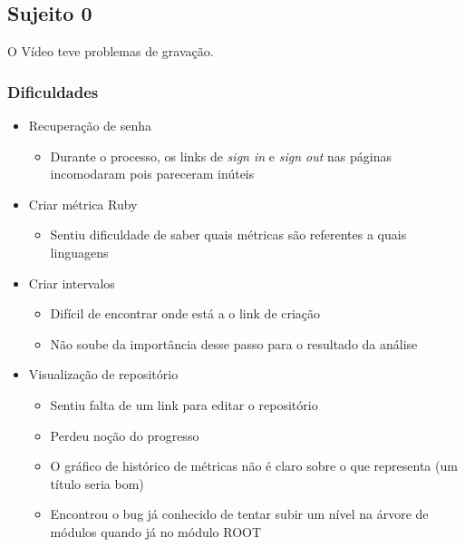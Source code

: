 \subsection{Sujeito 0}
  O Vídeo teve problemas de gravação.

  \subsubsection{Dificuldades}
  \begin{itemize}
    \item Recuperação de senha
      \begin{itemize}
        \item Durante o processo, os links de \textit{sign in} e \textit{sign out} nas páginas incomodaram pois pareceram inúteis
      \end{itemize}
    \item Criar métrica Ruby
      \begin{itemize}
        \item Sentiu dificuldade de saber quais métricas são referentes a quais linguagens
      \end{itemize}
    \item Criar intervalos
      \begin{itemize}
        \item Difícil de encontrar onde está a o link de criação
        \item Não soube da importância desse passo para o resultado da análise
      \end{itemize}
    \item Visualização de repositório
      \begin{itemize}
        \item Sentiu falta de um link para editar o repositório
        \item Perdeu noção do progresso
        \item O gráfico de histórico de métricas não é claro sobre o que representa (um título seria bom)
        \item Encontrou o bug já conhecido de tentar subir um nível na árvore de módulos quando já no módulo ROOT
      \end{itemize}
  \end{itemize}
